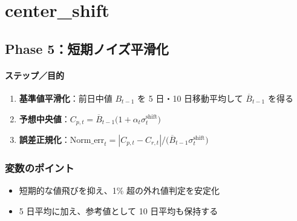 
\section*{center\_shift}\nopagebreak[4]

\subsection*{Phase 5：短期ノイズ平滑化}\nopagebreak[4]
\paragraph{ステップ／目的}
\begin{flushleft}
\begin{enumerate}
  \item \textbf{基準値平滑化}：前日中値 \(B_{t-1}\) を 5 日・10 日移動平均して
        \(\overline{B}_{t-1}\) を得る
  \item \textbf{予想中央値}：\(C_{p,t}=\overline{B}_{t-1}\bigl(1+\alpha_t\sigma_t^{\mathrm{shift}}\bigr)\)
  \item \textbf{誤差正規化}：\(\mathrm{Norm\_err}_t=|C_{p,t}-C_{r,t}|\big/\bigl(\overline{B}_{t-1}\sigma_t^{\mathrm{shift}}\bigr)\)
\end{enumerate}
\end{flushleft}

\subsubsection*{変数のポイント}
\begin{flushleft}
\begin{itemize}
  \item 短期的な値飛びを抑え、1\% 超の外れ値判定を安定化
  \item 5 日平均に加え、参考値として 10 日平均も保持する
\end{itemize}
\end{flushleft}

\bigskip
